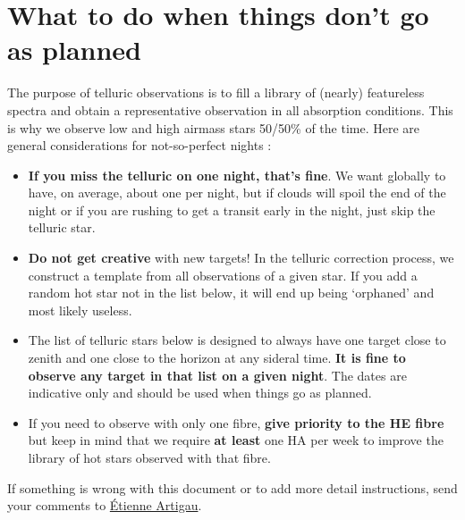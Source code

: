 \documentclass[article, trackchanges]{aastex63}
\begin{document}
\section{What to do when things don't go as planned}

The purpose of telluric observations is to fill a library of (nearly) featureless spectra and obtain a representative observation in all absorption conditions. This is why we observe low and high airmass stars 50/50\% of the time. Here are general considerations for not-so-perfect nights :
\begin{itemize}
    \item {\bf If you miss the telluric on one night, that's fine}. We want globally to have, on average, about one per night, but if clouds will spoil the end of the night or if you are rushing to get a transit early in the night, just skip the telluric star.
    \item {\bf Do not get creative} with new targets! In the telluric correction process, we construct a template from all observations of a given star. If you add a random hot star not in the list below, it will end up being `orphaned' and most likely useless.
    \item The list of telluric stars below is designed to always have one target close to zenith and one close to the horizon at any sideral time. {\bf It is fine to observe any target in that list on a given night}. The dates are indicative only and should be used when things go as planned.
    \item If you need to observe with only one fibre, {\bf give priority to the HE fibre} but keep in mind that we require {\bf at least} one HA per week to improve the library of hot stars observed with that fibre.
\end{itemize}



If something is wrong with this document or to add more detail instructions, send your comments to \href{mailto:etienne.artigau@umontreal.ca}{Étienne Artigau}.

\clearpage
\end{document}
